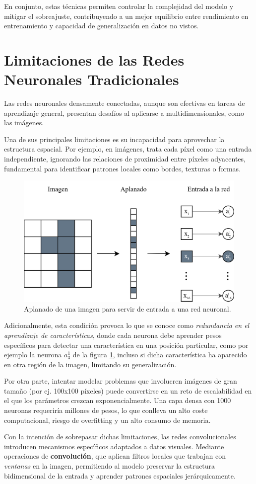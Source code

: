 En conjunto, estas técnicas permiten controlar la complejidad del modelo y mitigar el sobreajuste, contribuyendo a un mejor equilibrio entre rendimiento en entrenamiento y capacidad de generalización en datos no vistos.

\section{Limitaciones de las Redes Neuronales Tradicionales}\label{sec:limitaciones_rn}

Las redes neuronales densamente conectadas, aunque son efectivas en tareas de aprendizaje general, presentan desafíos al aplicarse a multidimensionales, como las imágenes.

Una de sus principales limitaciones es su incapacidad para aprovechar la estructura espacial. Por ejemplo, en imágenes, trata cada píxel como una entrada independiente, ignorando las relaciones de proximidad entre píxeles adyacentes, fundamental para identificar patrones locales como bordes, texturas o formas.

\begin{figure}[h]
	\centering
	\includegraphics[width=0.7\linewidth]{figures/ejemplos/imagen_a_red_neuronal.png}
	\caption{Aplanado de una imagen para servir de entrada a una red neuronal.}
	\label{fig:aplanado_imagen_red_neuronal}
\end{figure}

Adicionalmente, esta condición provoca lo que se conoce como \textit{redundancia en el aprendizaje de características}, donde cada neurona debe aprender pesos específicos para detectar una característica en una posición particular, como por ejemplo la neurona $a_{3}^{1}$ de la figura \ref{fig:aplanado_imagen_red_neuronal}, incluso si dicha característica ha aparecido en otra región de la imagen, limitando su generalización.

Por otra parte, intentar modelar problemas que involucren imágenes de gran
tamaño (por ej. 100x100 píxeles) puede convertirse en un reto de escalabilidad en el que los parámetros
crezcan exponencialmente. Una capa densa con 1000 neuronas requeriría millones
de pesos, lo que conlleva un alto coste computacional, riesgo de overfitting y
un alto consumo de memoria.

Con la intención de sobrepasar dichas limitaciones, las redes convolucionales introducen mecanismos específicos adaptados a datos visuales. Mediante operaciones de \textbf{convolución}, que aplican filtros locales que trabajan con \textit{ventanas} en la imagen, permitiendo al modelo preservar la estructura bidimensional de la entrada y aprender patrones espaciales jerárquicamente.

